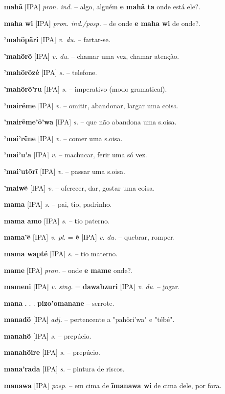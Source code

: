 \textbf{mahã} [IPA] \textit{pron. ind.} -- algo, alguém  \textbf{e mahã ta} onde está ele?.

\textbf{maha wi} [IPA] \textit{pron. ind./posp.} -- de onde  \textbf{e maha wi} de onde?.

\textbf{'mahöpãri} [IPA] \textit{v. du.} -- fartar-se.

\textbf{'mahörö} [IPA] \textit{v. du.} -- chamar uma vez, chamar atenção.

\textbf{'mahörözé} [IPA] \textit{s.} -- telefone.

\textbf{'mahörö'ru} [IPA] \textit{s.} -- imperativo (modo gramatical).

\textbf{'mairéme} [IPA] \textit{v.} -- omitir, abandonar, largar uma coisa.

\textbf{'mairẽme'õ'wa} [IPA] \textit{s.} -- que não abandona uma s.oisa.

\textbf{'mai'rẽne} [IPA] \textit{v.} -- comer uma s.oisa.

\textbf{'mai'u'a} [IPA] \textit{v.} -- machucar, ferir uma só vez.

\textbf{'mai'utõrĩ} [IPA] \textit{v.} -- passar uma s.oisa.

\textbf{'maiwẽ} [IPA] \textit{v.} -- oferecer, dar, gostar uma coisa.

\textbf{mama} [IPA] \textit{s.} -- pai, tio, padrinho.

\textbf{mama amo} [IPA] \textit{s.} -- tio paterno.

\textbf{mama'ẽ} [IPA] \textit{v. pl.} = \textbf{ẽ} [IPA] \textit{v. du.} -- quebrar, romper.

\textbf{mama wapté} [IPA] \textit{s.} -- tio materno.

\textbf{mame} [IPA] \textit{pron.} -- onde  \textbf{e mame} onde?.

\textbf{mameni} [IPA] \textit{v. sing.} = \textbf{dawabzuri} [IPA] \textit{v. du.} -- jogar.

\textbf{mana} . . .  \textbf{pizo'omanane} -- serrote.

\textbf{manadö} [IPA] \textit{adj.} -- pertencente a "pahöri'wa" e "tébé".

\textbf{manahö} [IPA] \textit{s.} -- prepúcio.

\textbf{manahöire} [IPA] \textit{s.} -- prepúcio.

\textbf{mana'rada} [IPA] \textit{s.} -- pintura de riscos.

\textbf{manawa} [IPA] \textit{posp.} -- em cima de  \textbf{ĩmanawa wi} de cima dele, por fora.

